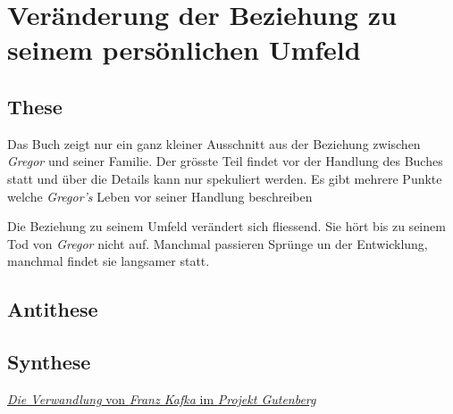 \documentclass[12pt,a4paper,twoside,titlepage]{article}
\begin{document}
	
	
	\section{Veränderung der Beziehung zu seinem persönlichen Umfeld}
	
	\subsection{These}
	
	Das Buch zeigt nur ein ganz kleiner Ausschnitt aus der Beziehung zwischen \textit{Gregor} und seiner Familie. Der grösste Teil findet vor der Handlung des Buches statt und über die Details kann nur spekuliert werden. Es gibt mehrere Punkte welche \textit{Gregor's} Leben vor seiner Handlung beschreiben
	
	Die Beziehung zu seinem Umfeld verändert sich fliessend. Sie hört bis zu seinem Tod von \textit{Gregor} nicht auf. Manchmal passieren Sprünge un der Entwicklung, manchmal findet sie langsamer statt. 
	
	\subsection{Antithese}
	
	\subsection{Synthese}
	
	
	
	\begin{thebibliography}{9}
		 \href{http://gutenberg.spiegel.de/buch/die-verwandlung-165/1}{\textit{Die Verwandlung} von \textit{Franz Kafka} im \textit{Projekt Gutenberg}}
			
	\end{thebibliography}
	
	
	
	
\end{document}
